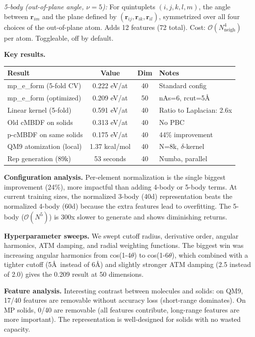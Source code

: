 \documentclass[11pt]{article}
\begin{document}
\textit{5-body (out-of-plane angle, $\nu = 5$):} For quintuplets $(i,j,k,l,m)$, the angle between $\mathbf{r}_{im}$ and the plane defined by $(\mathbf{r}_{ij}, \mathbf{r}_{ik}, \mathbf{r}_{il})$, symmetrized over all four choices of the out-of-plane atom. Adds 12 features (72 total). Cost: $\mathcal{O}(N_\text{neigh}^4)$ per atom. Toggleable, off by default.

\vspace{4pt}

\textbf{Key results.}

\begin{table}[h]
\centering
\small
\begin{tabular}{lccl}
\toprule
Result & Value & Dim & Notes \\
\midrule
mp\_e\_form (5-fold CV) & 0.222 eV/at & 40 & Standard config \\
mp\_e\_form (optimized) & 0.209 eV/at & 50 & nAs=6, rcut=5\AA \\
Linear kernel (5-fold) & 0.591 eV/at & 40 & Ratio to Laplacian: 2.6x \\
Old cMBDF on solids & 0.313 eV/at & 40 & No PBC \\
p-cMBDF on same solids & 0.175 eV/at & 40 & 44\% improvement \\
QM9 atomization (local) & 1.37 kcal/mol & 40 & N=8k, $\delta$-kernel \\
Rep generation (89k) & 53 seconds & 40 & Numba, parallel \\
\bottomrule
\end{tabular}
\end{table}

\textbf{Configuration analysis.} Per-element normalization is the single biggest improvement (24\%), more impactful than adding 4-body or 5-body terms. At current training sizes, the normalized 3-body (40d) representation beats the normalized 4-body (60d) because the extra features lead to overfitting. The 5-body ($\mathcal{O}(N^5)$) is 300x slower to generate and shows diminishing returns.

\textbf{Hyperparameter sweeps.} We swept cutoff radius, derivative order, angular harmonics, ATM damping, and radial weighting functions. The biggest win was increasing angular harmonics from cos(1-4$\theta$) to cos(1-6$\theta$), which combined with a tighter cutoff (5\AA\ instead of 6\AA) and slightly stronger ATM damping (2.5 instead of 2.0) gives the 0.209 result at 50 dimensions.

\textbf{Feature analysis.} Interesting contrast between molecules and solids: on QM9, 17/40 features are removable without accuracy loss (short-range dominates). On MP solids, 0/40 are removable (all features contribute, long-range features are more important). The representation is well-designed for solids with no wasted capacity.
\end{document}
